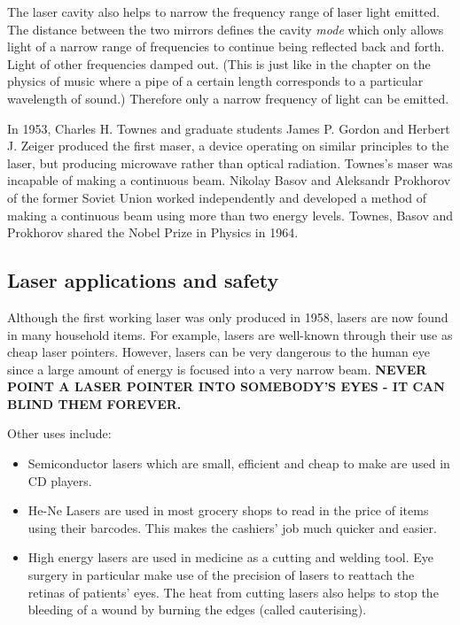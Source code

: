 The laser cavity also helps to narrow the frequency range of laser light emitted. The distance between the two mirrors defines the cavity \textit{mode} which only allows light of a narrow range of frequencies to continue being reflected back and forth. Light of other frequencies damped out. (This is just like in the chapter on the physics of music where a pipe of a certain length corresponds to a particular wavelength of sound.) Therefore only a narrow frequency of light can be emitted.


\begin{IFact}
{In 1953, Charles H. Townes and graduate students James P. Gordon and Herbert J. Zeiger produced the first maser, a device operating on similar principles to the laser, but producing microwave rather than optical radiation. Townes's maser was incapable of making a continuous beam. Nikolay Basov and Aleksandr Prokhorov of the former Soviet Union worked independently and developed a method of making a continuous beam using more than two energy levels. Townes, Basov and Prokhorov shared the Nobel Prize in Physics in 1964.}
\end{IFact}


\subsection{Laser applications and safety}
Although the first working laser was only produced in 1958, lasers are now found in many household items. For example, lasers are well-known through their use as cheap laser pointers. However, lasers can be very dangerous to the human eye since a large amount of energy is focused into a very narrow beam. \textbf{NEVER POINT A LASER POINTER INTO SOMEBODY'S EYES - IT CAN BLIND THEM FOREVER.}

Other uses include:
\begin{itemize}
\item Semiconductor lasers which are small, efficient and cheap to make are used in CD players. 
\item He-Ne Lasers are used in most grocery shops to read in the price of items using their barcodes. This makes the cashiers' job much quicker and easier.
\item High energy lasers are used in medicine as a cutting and welding tool. Eye surgery in particular make use of the precision of lasers to reattach the retinas of patients' eyes. The heat from cutting lasers also helps to stop the bleeding of a wound by burning the edges (called cauterising).
\end{itemize}


